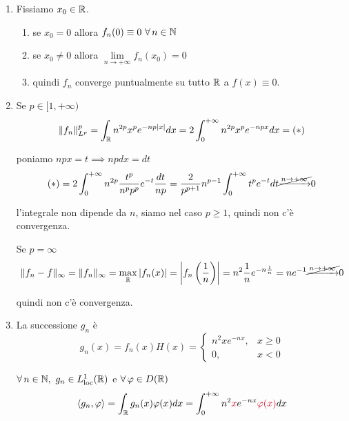 \begin{enumerate}
\item Fissiamo $x_{0} \in \mathbb{R} $.
\begin{enumerate}
\item se $x_{0} =0$ allora $f_{n}( 0) \equiv 0\ \forall n\in \NN $
\item se $x_{0} \neq 0$ allora $\lim\limits _{n\rightarrow +\infty } f_{n}( x_{0}) =0$
\item quindi $f_{n}$ converge puntualmente su tutto $\mathbb{R} $ a $f( x) \equiv 0$.
\end{enumerate}

\item Se $p\in [ 1,+\infty )$\begin{equation*}
\Vert f_{n}\Vert ^{p}_{L^{p}} =\int _{\mathbb{R} } n^{2p} x^{p} e^{-np| x| } dx=2\int ^{+\infty }_{0} n^{2p} x^{p} e^{-npx} dx=( *)
\end{equation*}

poniamo $npx=t\implies npdx=dt$\begin{equation*}
( *) =2\int ^{+\infty }_{0} n^{2p}\frac{t^{p}}{n^{p} p^{p}} e^{-t}\frac{dt}{np} =\frac{2}{p^{p+1}} n^{p-1}\int ^{+\infty }_{0} t^{p} e^{-t} dt\cancel{\xrightarrow{n\rightarrow +\infty }} 0
\end{equation*}

l'integrale non dipende da $n$, siamo nel caso $p\geqslant 1$, quindi non c'è convergenza.

Se $p=\infty $\begin{equation*}
\Vert f_{n} -f\Vert _{\infty } =\Vert f_{n}\Vert _{\infty } =\max_{\mathbb{R} }| f_{n}( x)| =\left| f_{n}\left(\frac{1}{n}\right)\right| =n^{2}\frac{1}{n} e^{-n\frac{1}{n}} =ne^{-1}\cancel{\xrightarrow{n\rightarrow +\infty }} 0
\end{equation*}

quindi non c'è convergenza.
\item La successione $g_{n}$ è\begin{equation*}
g_{n}( x) =f_{n}( x) H( x) =\begin{cases}
n^{2} xe^{-nx} , & x\geqslant 0\\
0, & x< 0
\end{cases}
\end{equation*}

$\forall n\in \NN  ,\ g_{n} \in L^{1}_{\mathrm{loc}}(\RR )$ e $\forall \varphi \in D(\RR )$\begin{equation*}
\langle g_{n} ,\varphi \rangle =\int _{\RR } g_{n}( x) \varphi ( x) dx=\int ^{+\infty }_{0} n^{2}\textcolor[rgb]{0.82,0.01,0.11}{x} e^{-nx}\textcolor[rgb]{0.82,0.01,0.11}{\varphi }\textcolor[rgb]{0.82,0.01,0.11}{(}\textcolor[rgb]{0.82,0.01,0.11}{x}\textcolor[rgb]{0.82,0.01,0.11}{)} dx
\end{equation*}


\end{enumerate}
